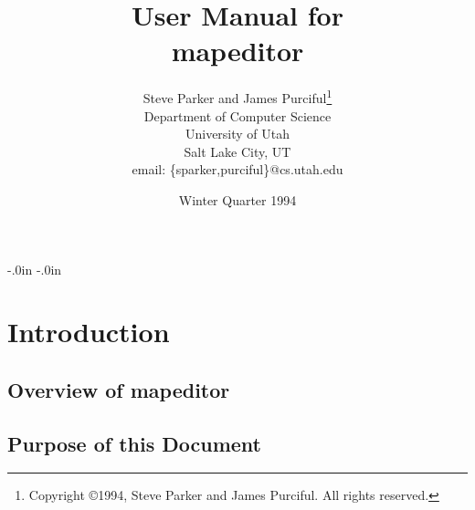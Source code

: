 % 
% 
%

\topmargin -0.45in
\textheight 9.0in
\oddsidemargin -.0in
\evensidemargin -.0in
\textwidth 6.5in





\setlength{\baselineskip}{1.2\baselineskip}

\setlength{\parskip}{\smallskipamount}


\title {User Manual for\\
mapeditor}

\author {Steve Parker and James Purciful\thanks{Copyright \copyright 1994,
Steve Parker and James Purciful.  All rights reserved.}\\ 
Department of Computer Science\\ 
University of Utah\\ 
Salt Lake City, UT\\ 
email: \{sparker,purciful\}@cs.utah.edu}

\date {Winter Quarter 1994}



\maketitle

\tableofcontents




\chapter{Introduction}


\section{Overview of mapeditor}


\section{Purpose of this Document}


